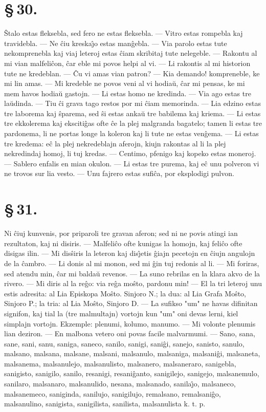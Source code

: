 \section*{\S\,30.}
\^Stalo estas fleksebla, sed fero ne estas fleksebla. --- Vitro
estas rompebla kaj travidebla. --- Ne \^ciu kreska\^{\j}o estas
man\^gebla. --- Via parolo estas tute nekomprenebla kaj viaj leteroj
estas \^ciam skribitaj tute nelegeble. --- Rakontu al mi vian
malfeli\^con, \^car eble mi povos helpi al vi. --- Li rakontis al mi
historion tute ne kredeblan. --- \^Cu vi amas vian patron? --- Kia
demando! kompreneble, ke mi lin amas. --- Mi kredeble ne povos veni
al vi hodia\u u, \^car mi pensas, ke mi mem havos hodia\u u gastojn.
--- Li estas homo ne kredinda. --- Via ago estas tre la\u udinda. --- Tiu
\^ci grava tago restos por mi \^ciam memorinda. --- Lia edzino estas
tre laborema kaj \^sparema, sed \^si estas anka\u u tre babilema kaj
kriema. --- Li estas tre ekkolerema kaj eksciti\^gas ofte \^ce la
plej malgranda bagatelo; tamen li estas tre pardonema, li ne portas
longe la koleron kaj li tute ne estas ven\^gema. --- Li estas tre
kredema: e\^c la plej nekredeblajn aferojn, kiujn rakontas al li la
plej nekredindaj homoj, li tuj kredas. --- Centimo, pfenigo kaj
kopeko estas moneroj. --- Sablero enfalis en mian okulon. --- Li
estas tre purema, kaj e\^c unu polveron vi ne trovos sur lia vesto.
--- Unu fajrero estas sufi\^ca, por eksplodigi pulvon.


\section*{\S\,31.}
Ni \^ciuj kunvenis, por priparoli tre gravan aferon; sed ni ne povis
atingi ian rezultaton, kaj ni disiris. --- Malfeli\^co ofte kunigas
la homojn, kaj feli\^co ofte disigas ilin. --- Mi dis\^siris la
leteron kaj dis\^{\j}etis \^giajn pecetojn en \^ciujn angulojn de la
\^cambro. --- Li donis al mi monon, sed mi \^gin tuj redonis al li.
--- Mi foriras, sed atendu min, \^car mi balda\u u revenos. --- La suno
rebrilas en la klara akvo de la rivero. --- Mi diris al la re\^go:
via re\^ga mo\^sto, pardonu min! --- El la tri leteroj unu estis
adresita: al Lia Episkopa Mo\^sto. Sinjoro N.; la dua: al Lia Grafa
Mo\^sto, Sinjoro P.; la tria: al Lia Mo\^sto, Sinjoro D. --- La
sufikso "um" ne havas difinitan signifon, kaj tial la (tre
malmultajn) vortojn kun "um" oni devas lerni, kiel simplajn
vortojn. Ekzemple: plenumi, kolumo, manumo. --- Mi volonte plenumis
lian deziron. --- En malbona vetero oni povas facile malvarmumi. ---
Sano, sana, sane, sani, sanu, saniga, saneco, sanilo, sanigi,
sani\^gi, sanejo, sanisto, sanulo, malsano, malsana, malsane,
malsani, malsanulo, malsaniga, malsani\^gi, malsaneta, malsanema,
malsanulejo, malsanulisto, malsanero, malsaneraro, sanigebla,
sanigisto, sanigilo, sanilo, resanigi, resani\^ganto, sanigilejo,
sanigejo, malsanemulo, sanilaro, malsanaro, malsanulido, nesana,
malsanado, sanila\^{\j}o, malsaneco, malsanemeco, saniginda,
sanilujo, sanigilujo, remalsano, remalsani\^go, malsanulino,
sanigista, sanigilista, sanilista, malsanulista k. t. p.
